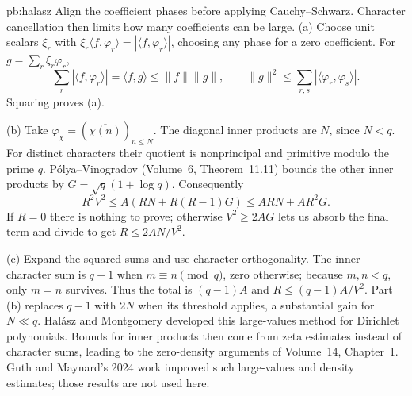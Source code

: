 \begin{solution}{pb:halasz}
\idea Align the coefficient phases before applying Cauchy--Schwarz. Character cancellation then limits how many coefficients can be large.
\writeup (a) Choose unit scalars $\xi_r$ with $\overline\xi_r\langle f,\varphi_r\rangle=|\langle f,\varphi_r\rangle|$, choosing any phase for a zero coefficient. For $g=\sum_r\xi_r\varphi_r$,
\[\sum_r|\langle f,\varphi_r\rangle|=\langle f,g\rangle\le\|f\|\|g\|,
\qquad\|g\|^2\le\sum_{r,s}|\langle\varphi_r,\varphi_s\rangle|.
\]
Squaring proves (a).

(b) Take $\varphi_\chi=(\overline{\chi(n)})_{n\le N}$. The diagonal inner products are $N$, since $N<q$. For distinct characters their quotient is nonprincipal and primitive modulo the prime $q$. Pólya--Vinogradov (Volume~6, Theorem~11.11) bounds the other inner products by $G=\sqrt q(1+\log q)$. Consequently
\[R^2V^2\le A(RN+R(R-1)G)\le ARN+AR^2G.
\]
If $R=0$ there is nothing to prove; otherwise $V^2\ge2AG$ lets us absorb the final term and divide to get $R\le2AN/V^2$.

(c) Expand the squared sums and use character orthogonality. The inner character sum is $q-1$ when $m\equiv n\pmod q$, zero otherwise; because $m,n<q$, only $m=n$ survives. Thus the total is $(q-1)A$ and $R\le(q-1)A/V^2$. Part (b) replaces $q-1$ with $2N$ when its threshold applies, a substantial gain for $N\ll q$.
\leads Halász and Montgomery developed this large-values method for Dirichlet polynomials. Bounds for inner products then come from zeta estimates instead of character sums, leading to the zero-density arguments of Volume~14, Chapter~1. Guth and Maynard's 2024 work improved such large-values and density estimates; those results are not used here.
\end{solution}

